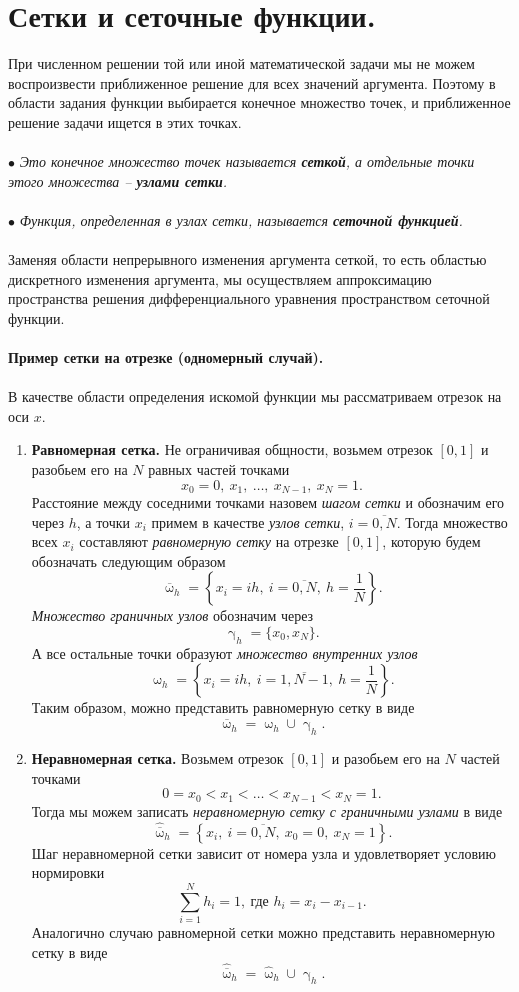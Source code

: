 \documentclass[a4paper, 12pt]{report}
\numberwithin{equation}{section}
\renewcommand{\gamma}{\upgamma}
\renewcommand{\omega}{\upomega}
\begin{document}
\section{Сетки и сеточные функции.}
При численном решении той или иной математической задачи мы не можем воспроизвести приближенное решение для всех значений аргумента. Поэтому в области задания функции выбирается конечное множество точек, и приближенное решение задачи ищется в этих точках.
\\\\
$\bullet$ \textit{Это конечное множество точек называется \textbf{сеткой}, а отдельные точки этого множества -- \textbf{узлами сетки}.}
\\\\
$\bullet$ \textit{Функция, определенная в узлах сетки, называется \textbf{сеточной функцией}.}
\\\\
Заменяя области непрерывного изменения аргумента сеткой, то есть областью дискретного изменения аргумента, мы осуществляем аппроксимацию пространства решения дифференциального уравнения пространством сеточной функции.
\\\\
\textbf{Пример сетки на отрезке (одномерный случай).}\\\\
В качестве области определения искомой функции мы рассматриваем отрезок на оси $x$.
\begin{enumerate}
\item \textbf{Равномерная сетка.}
Не ограничивая общности, возьмем отрезок $[0,1]$ и разобьем его на $N$ равных частей точками $$x_0=0,\ x_1,\ \ldots,\ x_{N-1},\ x_N=1.$$
Расстояние между соседними точками назовем \textit{шагом сетки} и обозначим его через $h$, а точки $x_i$ примем в качестве \textit{узлов сетки}, $i=\overline{0,N}$. Тогда множество всех $x_i$ составляют \textit{равномерную сетку} на отрезке $[0,1]$, которую будем обозначать следующим образом
$$\overline \omega _ h = \left\{x_i = ih,\ i=\overline{0, N},\ h = \dfrac1N\right\}.$$
\textit{Множество граничных узлов} обозначим через $$\gamma_h = \{x_0, x_N\}.$$
А все остальные точки образуют \textit{множество внутренних узлов}
$$ \omega _ h = \left\{x_i = ih,\ i=\overline{1, N-1},\ h = \dfrac1N\right\}.$$
Таким образом, можно представить равномерную сетку в виде
$$\overline \omega _h = \omega _h \cup \gamma _h.$$
\item \textbf{Неравномерная сетка.}
Возьмем отрезок $[0,1]$ и разобьем его на $N$ частей точками $$0=x_0 < x_1 <\ldots< x_{N-1} < x_N=1.$$
Тогда мы можем записать \textit{неравномерную сетку с граничными узлами} в виде
$$\hat {\overline \omega} _ h = \left\{x_i,\ i=\overline{0, N},\ x_0 = 0, \ x_N=1\right\}.$$
Шаг неравномерной сетки зависит от номера узла и удовлетворяет условию нормировки $$\sum_{i=1}^{N} h_i=1,\ \text{где } h_i=x_i - x_{i-1}.$$
Аналогично случаю равномерной сетки можно представить неравномерную сетку в виде $$\hat {\overline \omega} _ h = \hat \omega_h \cup \hat\gamma _h.$$
\end{enumerate}
\end{document}
